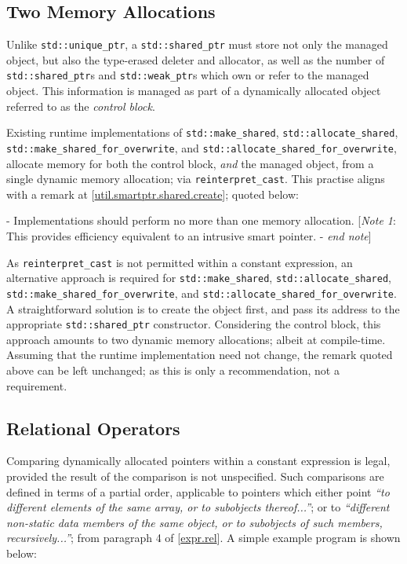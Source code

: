 \documentclass[10pt]{article}
\newcommand*{\wgxxi}[1]{[\href{https://wg21.link/#1}{#1}]}
\begin{document}
\subsection{Two Memory Allocations}

Unlike \texttt{std::unique\_ptr}, a \texttt{std::shared\_ptr} must store not
only the managed object, but also the type-erased deleter and allocator, as
well as the number of \texttt{std::shared\_ptr}s and \texttt{std::weak\_ptr}s
which own or refer to the managed object. This information is managed as part
of a dynamically allocated object referred to as the \emph{control block}.

Existing runtime implementations of \texttt{std::make\_shared},
\texttt{std::allocate\_shared}, \linebreak
\texttt{std::make\_shared\_for\_overwrite}, and
\texttt{std::allocate\_shared\_for\_overwrite}, allocate memory for both the
control block, \emph{and} the managed object, from a single dynamic memory
allocation; via \texttt{reinterpret\_cast}.  This practise aligns with a remark
at \wgxxi{util.smartptr.shared.create}; quoted below:

 - Implementations should perform no more than one memory allocation.\newline
\makebox[0pt][r]{\quad} \phantom{-} [\emph{Note 1}: This provides efficiency equivalent to an intrusive smart pointer.  - \emph{end note}]

As \texttt{reinterpret\_cast} is not permitted within a constant expression, an
alternative approach is required for \texttt{std::make\_shared},
\texttt{std::allocate\_shared}, \texttt{std::make\_shared\_for\_overwrite},
and \linebreak \texttt{std::allocate\_shared\_for\_overwrite}.  A
straightforward solution is to create the object first, and pass its address to
the appropriate \texttt{std::shared\_ptr} constructor. Considering the control
block, this approach amounts to two dynamic memory allocations; albeit at
compile-time. Assuming that the runtime implementation need not change, the
remark quoted above can be left unchanged; as this is only a recommendation,
not a requirement.

\subsection{Relational Operators}

Comparing dynamically allocated pointers within a constant expression is legal,
provided the result of the comparison is not unspecified.  Such comparisons are
defined in terms of a partial order, applicable to pointers which either point
\emph{``to different elements of the same array, or to subobjects
thereof...''}; or to \emph{``different non-static data members of the same
object, or to subobjects of such members, recursively...''}; from paragraph 4
of \wgxxi{expr.rel}. A simple example program is shown below:
\end{document}
